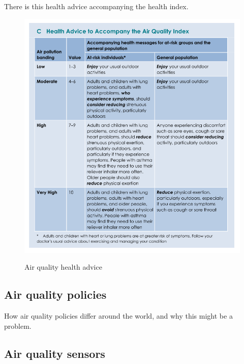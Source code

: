 There is this health advice accompanying the health index.

\begin{figure}[H]
\begin{adjustbox}{width=1\textwidth,center=\textwidth}
  \centering
  \includegraphics[scale=.8]{images/air_quality_health_advice.png}
  \label{fig:air_quality_health_advice}
\end{adjustbox}
  \caption[Air quality health advice]{Air quality health advice \cite{HealthProtectionAgencyfortheCommitteeontheMedicalEffectsofAirPollutants2011}}
\end{figure}

\subsection{Air quality policies}
How air quality policies differ around the world, and why this might be a problem.

\subsection{Air quality sensors}

